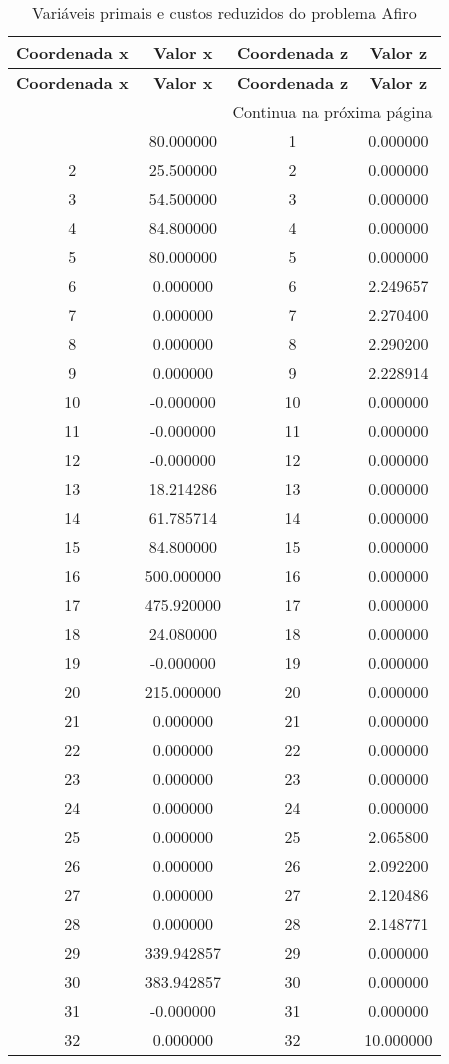 \documentclass[12pt]{article}
\begin{document}
\begin{longtable}{@{}cccc@{}}
\caption{Variáveis primais e custos reduzidos do problema Afiro} \\
\toprule
\textbf{Coordenada x} & \textbf{Valor x} & \textbf{Coordenada z} & \textbf{Valor z} \\
\midrule
\endfirsthead

\toprule
\textbf{Coordenada x} & \textbf{Valor x} & \textbf{Coordenada z} & \textbf{Valor z} \\
\midrule
\endhead

\midrule \multicolumn{4}{r}{{Continua na próxima página}} \\ \midrule
\endfoot

\bottomrule
\endlastfoot
1 & 80.000000 & 1 & 0.000000 \\
2 & 25.500000 & 2 & 0.000000 \\
3 & 54.500000 & 3 & 0.000000 \\
4 & 84.800000 & 4 & 0.000000 \\
5 & 80.000000 & 5 & 0.000000 \\
6 & 0.000000 & 6 & 2.249657 \\
7 & 0.000000 & 7 & 2.270400 \\
8 & 0.000000 & 8 & 2.290200 \\
9 & 0.000000 & 9 & 2.228914 \\
10 & -0.000000 & 10 & 0.000000 \\
11 & -0.000000 & 11 & 0.000000 \\
12 & -0.000000 & 12 & 0.000000 \\
13 & 18.214286 & 13 & 0.000000 \\
14 & 61.785714 & 14 & 0.000000 \\
15 & 84.800000 & 15 & 0.000000 \\
16 & 500.000000 & 16 & 0.000000 \\
17 & 475.920000 & 17 & 0.000000 \\
18 & 24.080000 & 18 & 0.000000 \\
19 & -0.000000 & 19 & 0.000000 \\
20 & 215.000000 & 20 & 0.000000 \\
21 & 0.000000 & 21 & 0.000000 \\
22 & 0.000000 & 22 & 0.000000 \\
23 & 0.000000 & 23 & 0.000000 \\
24 & 0.000000 & 24 & 0.000000 \\
25 & 0.000000 & 25 & 2.065800 \\
26 & 0.000000 & 26 & 2.092200 \\
27 & 0.000000 & 27 & 2.120486 \\
28 & 0.000000 & 28 & 2.148771 \\
29 & 339.942857 & 29 & 0.000000 \\
30 & 383.942857 & 30 & 0.000000 \\
31 & -0.000000 & 31 & 0.000000 \\
32 & 0.000000 & 32 & 10.000000 \\

\end{longtable}
\end{document}
